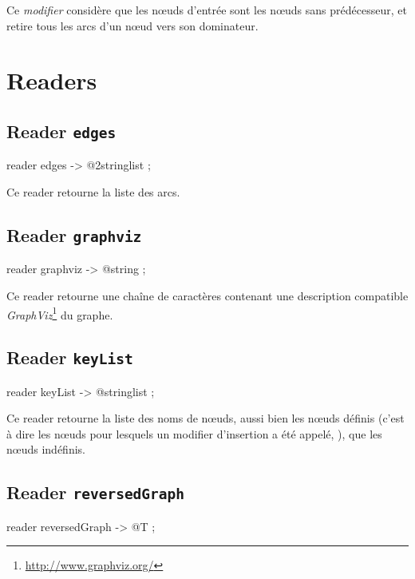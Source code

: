 Ce \emph{modifier} considère que les nœuds d'entrée sont les nœuds sans prédécesseur, et retire tous les arcs d'un nœud vers son dominateur.

\section{Readers}

\subsection{Reader \texttt{edges}}

\begin{galgascode}
reader edges -> @2stringlist ;
\end{galgascode}

Ce reader retourne la liste des arcs.


\subsection{Reader \texttt{graphviz}}

\begin{galgascode}
reader graphviz -> @string ;
\end{galgascode}

Ce reader retourne une chaîne de caractères contenant une description compatible \emph{GraphViz}\footnote{\url{http://www.graphviz.org/}} du graphe.


\subsection{Reader \texttt{keyList}}

\begin{galgascode}
reader keyList -> @stringlist ;
\end{galgascode}

Ce reader retourne la liste des noms de nœuds, aussi bien les nœuds définis (c'est à dire les nœuds pour lesquels un modifier d'insertion a été appelé, ), que les nœuds indéfinis.



\subsection{Reader \texttt{reversedGraph}}

\begin{galgascode}
reader reversedGraph -> @T ;
\end{galgascode}

